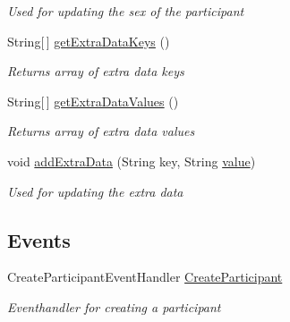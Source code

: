 \begin{DoxyCompactItemize}
\begin{DoxyCompactList}\small\item\em Used for updating the sex of the participant \end{DoxyCompactList}\item 
String\mbox{[}$\,$\mbox{]} \hyperlink{class_web_analyzer_1_1_u_i_1_1_interaction_objects_1_1_participant_control_a28a3491cdd7ee8a3be6da78a83d154d4}{get\+Extra\+Data\+Keys} ()
\begin{DoxyCompactList}\small\item\em Returns array of extra data keys \end{DoxyCompactList}\item 
String\mbox{[}$\,$\mbox{]} \hyperlink{class_web_analyzer_1_1_u_i_1_1_interaction_objects_1_1_participant_control_a6bd9c0492867f0c71038065afea17312}{get\+Extra\+Data\+Values} ()
\begin{DoxyCompactList}\small\item\em Returns array of extra data values \end{DoxyCompactList}\item 
void \hyperlink{class_web_analyzer_1_1_u_i_1_1_interaction_objects_1_1_participant_control_adbcd1d9e24fe7d5bcf2f68c618cabfe1}{add\+Extra\+Data} (String key, String \hyperlink{_u_i_2_h_t_m_l_resources_2js_2lib_2underscore_8min_8js_af7e1471ab89699458c4df8bb657298f6}{value})
\begin{DoxyCompactList}\small\item\em Used for updating the extra data \end{DoxyCompactList}\end{DoxyCompactItemize}
\subsection*{Events}
\begin{DoxyCompactItemize}
\item 
Create\+Participant\+Event\+Handler \hyperlink{class_web_analyzer_1_1_u_i_1_1_interaction_objects_1_1_participant_control_a05567dca7355e947bf348985f4227d36}{Create\+Participant}
\begin{DoxyCompactList}\small\item\em Eventhandler for creating a participant \end{DoxyCompactList}\end{DoxyCompactItemize}
